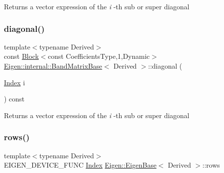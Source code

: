 \begin{DoxyReturn}{Returns}
a vector expression of the {\itshape i} -\/th sub or super diagonal 
\end{DoxyReturn}
\mbox{\label{class_eigen_1_1internal_1_1_band_matrix_base_a8f7146e80405018d6d0827c4a7713ad3}} 
\subsubsection{\texorpdfstring{diagonal()}{diagonal()}\hspace{0.1cm}{\footnotesize\ttfamily [6/6]}}
{\footnotesize\ttfamily template$<$typename Derived$>$ \\
const \mbox{\hyperlink{class_eigen_1_1_block}{Block}}$<$const Coefficients\+Type,1,Dynamic$>$ \mbox{\hyperlink{class_eigen_1_1internal_1_1_band_matrix_base}{Eigen\+::internal\+::\+Band\+Matrix\+Base}}$<$ Derived $>$\+::diagonal (\begin{DoxyParamCaption}\item[{\mbox{\hyperlink{struct_eigen_1_1_eigen_base_a554f30542cc2316add4b1ea0a492ff02}{Index}}}]{i }\end{DoxyParamCaption}) const\hspace{0.3cm}{\ttfamily [inline]}}

\begin{DoxyReturn}{Returns}
a vector expression of the {\itshape i} -\/th sub or super diagonal 
\end{DoxyReturn}
\mbox{\label{class_eigen_1_1internal_1_1_band_matrix_base_a8141320ba8df384426c298b32b000d8e}} 
\subsubsection{\texorpdfstring{rows()}{rows()}}
{\footnotesize\ttfamily template$<$typename Derived$>$ \\
E\+I\+G\+E\+N\+\_\+\+D\+E\+V\+I\+C\+E\+\_\+\+F\+U\+NC \mbox{\hyperlink{struct_eigen_1_1_eigen_base_a554f30542cc2316add4b1ea0a492ff02}{Index}} \mbox{\hyperlink{struct_eigen_1_1_eigen_base}{Eigen\+::\+Eigen\+Base}}$<$ Derived $>$\+::rows\hspace{0.3cm}{\ttfamily [inline]}}

